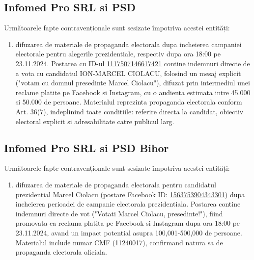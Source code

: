 \documentclass[a4paper,12pt]{article}
\begin{document}
\vspace{0.5cm}

\subsection{Infomed Pro SRL si PSD}
Următoarele fapte contravenționale sunt sesizate împotriva acestei entități:

\begin{enumerate}[leftmargin=*, label=\arabic*.)]
    \item difuzarea de materiale de propaganda electorala dupa incheierea campaniei electorale pentru alegerile prezidentiale, respectiv dupa ora 18:00 pe 23.11.2024. Postarea cu ID-ul \href{https://www.facebook.com/ads/library/?id=1117507146617421}{1117507146617421} contine indemnuri directe de a vota cu candidatul ION-MARCEL CIOLACU, folosind un mesaj explicit ("votam cu domnul presedinte Marcel Ciolacu"), difuzat prin intermediul unei reclame platite pe Facebook si Instagram, cu o audienta estimata intre 45.000 si 50.000 de persoane. Materialul reprezinta propaganda electorala conform Art. 36(7), indeplinind toate conditiile: referire directa la candidat, obiectiv electoral explicit si adresabilitate catre publicul larg.
\end{enumerate}

\vspace{0.5cm}

\subsection{Infomed Pro SRL si PSD Bihor}
Următoarele fapte contravenționale sunt sesizate împotriva acestei entități:

\begin{enumerate}[leftmargin=*, label=\arabic*.)]
    \item difuzarea de materiale de propaganda electorala pentru candidatul prezidential Marcel Ciolacu (postare Facebook ID: \href{https://www.facebook.com/ads/library/?id=1563753904343301}{1563753904343301}) dupa incheierea perioadei de campanie electorala prezidentiala. Postarea contine indemnuri directe de vot ("Votati Marcel Ciolacu, presedinte!"), fiind promovata ca reclama platita pe Facebook si Instagram dupa ora 18:00 pe 23.11.2024, avand un impact potential asupra 100,001-500,000 de persoane. Materialul include numar CMF (11240017), confirmand natura sa de propaganda electorala oficiala.
\end{enumerate}
\end{document}
